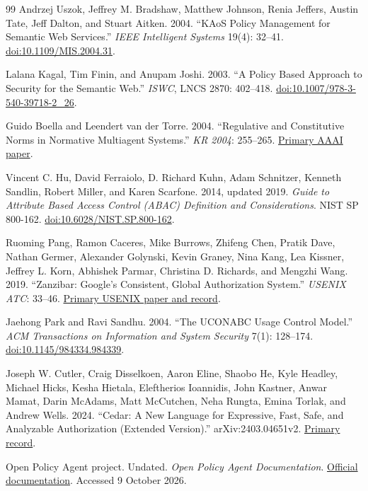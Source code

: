 \documentclass[
  english,
  12pt,
  a4paper,
  preprint,
  numbers,
  nopreprintline]{elsarticle}
\begin{document}
\begin{thebibliography}{99}
Andrzej Uszok, Jeffrey M. Bradshaw, Matthew Johnson, Renia Jeffers,
Austin Tate, Jeff Dalton, and Stuart Aitken. 2004. ``KAoS Policy
Management for Semantic Web Services.'' \emph{IEEE Intelligent Systems}
19(4): 32--41.
\href{https://doi.org/10.1109/MIS.2004.31}{doi:10.1109/MIS.2004.31}.

Lalana Kagal, Tim Finin, and Anupam Joshi. 2003. ``A Policy Based
Approach to Security for the Semantic Web.'' \emph{ISWC}, LNCS 2870:
402--418.
\href{https://doi.org/10.1007/978-3-540-39718-2_26}{doi:10.1007/978-3-540-39718-2\_26}.

Guido Boella and Leendert van der Torre. 2004. ``Regulative and
Constitutive Norms in Normative Multiagent Systems.'' \emph{KR 2004}:
255--265. \href{https://cdn.aaai.org/KR/2004/KR04-028.pdf}{Primary AAAI
paper}.

Vincent C. Hu, David Ferraiolo, D. Richard Kuhn, Adam Schnitzer, Kenneth
Sandlin, Robert Miller, and Karen Scarfone. 2014, updated 2019.
\emph{Guide to Attribute Based Access Control (ABAC) Definition and
Considerations}. NIST SP 800-162.
\href{https://doi.org/10.6028/NIST.SP.800-162}{doi:10.6028/NIST.SP.800-162}.

Ruoming Pang, Ramon Caceres, Mike Burrows, Zhifeng Chen, Pratik Dave,
Nathan Germer, Alexander Golynski, Kevin Graney, Nina Kang, Lea Kissner,
Jeffrey L. Korn, Abhishek Parmar, Christina D. Richards, and Mengzhi
Wang. 2019. ``Zanzibar: Google's Consistent, Global Authorization
System.'' \emph{USENIX ATC}: 33--46.
\href{https://www.usenix.org/conference/atc19/presentation/pang}{Primary
USENIX paper and record}.

Jaehong Park and Ravi Sandhu. 2004. ``The UCONABC Usage Control Model.''
\emph{ACM Transactions on Information and System Security} 7(1):
128--174.
\href{https://doi.org/10.1145/984334.984339}{doi:10.1145/984334.984339}.

Joseph W. Cutler, Craig Disselkoen, Aaron Eline, Shaobo He, Kyle
Headley, Michael Hicks, Kesha Hietala, Eleftherios Ioannidis, John
Kastner, Anwar Mamat, Darin McAdams, Matt McCutchen, Neha Rungta, Emina
Torlak, and Andrew Wells. 2024. ``Cedar: A New Language for Expressive,
Fast, Safe, and Analyzable Authorization (Extended Version).''
arXiv:2403.04651v2. \href{https://arxiv.org/abs/2403.04651v2}{Primary
record}.

Open Policy Agent project. Undated. \emph{Open Policy Agent
Documentation}. \href{https://www.openpolicyagent.org/docs}{Official
documentation}. Accessed 9 October 2026.


\end{thebibliography}
\end{document}

